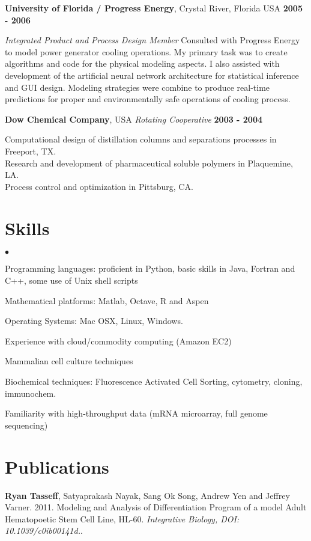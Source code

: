 \documentclass[margin,line]{res}
\newenvironment{list2}{
  \begin{list}{$\bullet$}{%
      \setlength{\itemsep}{0in}
      \setlength{\parsep}{0in} \setlength{\parskip}{0in}
      \setlength{\topsep}{0in} \setlength{\partopsep}{0in} 
      \setlength{\leftmargin}{0.2in}}}{\end{list}}
\begin{document}
\begin{resume}
{\bf University of Florida / Progress Energy}, Crystal River, Florida USA \hfill {\bf 2005 - 2006}

\vspace{-.35cm}
{\em Integrated Product and Process Design Member} 
Consulted with Progress Energy to model power generator cooling operations.
My primary task was to create algorithms and code for the physical modeling aspects. 
I also assisted with development of the artificial neural network architecture for statistical inference
and GUI design.  Modeling strategies were combine to produce real-time predictions
for proper and environmentally safe operations of cooling process.
\vspace{-.2cm}

{\bf Dow Chemical Company},  USA {\em Rotating Cooperative} \hfill {\bf 2003 - 2004}

\vspace{-.35cm}
Computational design of distillation columns and separations processes in Freeport, TX.\\
Research and development of pharmaceutical soluble polymers in Plaquemine, LA.\\
Process control and optimization in Pittsburg, CA.  


\section{\sc Skills} 
\begin{list2}
\item Programming languages: proficient in Python, basic skills in Java, Fortran and C++, some use of Unix shell scripts 
\item Mathematical platforms:  Matlab, Octave, R and Aspen
\item Operating Systems:  Mac OSX, Linux, Windows.
\item Experience with cloud/commodity computing (Amazon EC2)
\item Mammalian cell culture techniques
\item Biochemical techniques: Fluorescence Activated Cell Sorting, cytometry, cloning, immunochem.
\item Familiarity with high-throughput data (mRNA microarray, full genome sequencing)
\end{list2}



\section{\sc Publications}
{\bf Ryan Tasseff}, Satyaprakash Nayak, Sang Ok Song, Andrew Yen and Jeffrey Varner. 2011. 
Modeling and Analysis of Differentiation Program of a model Adult Hematopoetic Stem Cell Line, HL-60.
{\it Integrative Biology, DOI: 10.1039/c0ib00141d.}. 


\end{resume}
\end{document}
